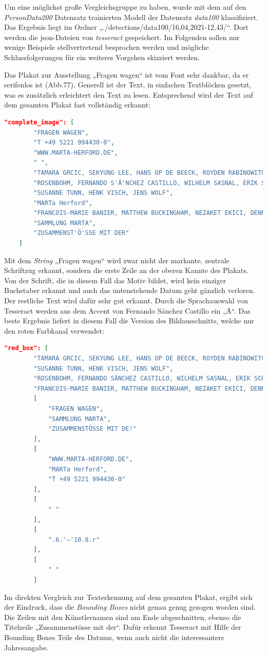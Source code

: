 \documentclass[a4paper,12pt,ngerman]{article}
\begin{document}
Um eine möglichst große Vergleichsgruppe zu haben, wurde mit dem auf den \textit{PersonData200} Datensatz trainierten Modell der Datensatz \textit{data100} klassifiziert. Das Ergebnis liegt im Ordner „./detections/data100/16,04,2021-12,43/“. Dort werden die json-Dateien von \textit{tesseract} gespeichert. Im Folgenden sollen nur wenige Beispiele stellvertretend besprochen werden und mögliche Schlussfolgerungen für ein weiteres Vorgehen skizziert werden.

Das Plakat zur Ausstellung „Fragen wagen“ ist vom Font sehr dankbar, da er serifenlos ist (Abb.77). Generell ist der Text, in einfachen Textblöcken gesetzt, was es zusätzlich erleichtert den Text zu lesen. Entsprechend wird der Text auf dem gesamten Plakat fast vollständig erkannt:

\begin{lstlisting}[language=json,escapeinside='']
	"complete_image": [
        "FRAGEN WAGEN",
        "T +49 5221 994430-0",
        "WWW.MARTA-HERFORD.DE",
        " ",
        "TAMARA GRCIC, SEKYUNG LEE, HANS OP DE BEECK, ROYDEN RABINOWITCH, LARS",
		"ROSENBOHM, FERNANDO S'Ä'NCHEZ CASTILLO, WILHELM SASNAL, ERIK SCHMIDT,",
        "SUSANNE TUNN, HENK VISCH, JENS WOLF",
        "MARTa Herford",
        "FRANCOIS-MARIE BANIER, MATTHEW BUCKINGHAM, NEZAKET EKICI, DENNIS FESER,",
        "SAMMLUNG MARTA",
        "ZUSAMMENST'Ö'SSE MIT DER"
    ]
\end{lstlisting}

Mit dem \textit{String} „Fragen wagen“ wird zwar nicht der markante, zentrale Schriftzug erkannt, sondern die erste Zeile an der oberen Kannte des Plakats. Von der Schrift, die in diesem Fall das Motiv bildet, wird kein einziger Buchstaber erkannt und auch das untenstehende Datum geht gänzlich verloren. Der restliche Text wird dafür sehr gut erkannt. Durch die Sprachauswahl von Tesseract werden aus dem Accent von Fernando Sánchez Castillo ein „Ä“. Das beste Ergebnis liefert in diesem Fall die Version des Bildausschnitts, welche nur den roten Farbkanal verwendet:

\begin{lstlisting}[language=json,escapeinside='']
	"red_box": [
        "TAMARA GRCIC, SEKYUNG LEE, HANS OP DE BEECK, ROYDEN RABINOWITCH, LAR",
        "SUSANNE TUNN, HENK VISCH, JENS WOLF",
        "ROSENBOHM, FERNANDO SÄNCHEZ CASTILLO, WILHELM SASNAL, ERIK SCHMIDI",
        "FRANCOIS-MARIE BANIER, MATTHEW BUCKINGHAM, NEZAKET EKICI, DENNIS FES|",
        [
            "FRAGEN WAGEN",
            "SAMMLUNG MARTA",
            "ZUSAMMENSTÖSSE MIT DE!"
        ],
        [
            "WWW.MARTA-HERFORD.DE",
            "MARTa Herford",
            "T +49 5221 994430-0"
        ],
        [
            " "
        ],
        [
            ".6.'—'10.8.r"
        ],
        [
            " "
        ]
\end{lstlisting}
Im direkten Vergleich zur Texterkennung auf dem gesamten Plakat, ergibt sich der Eindruck, dass die \textit{Bounding Boxes} nicht genau genug gezogen worden sind. Die Zeilen mit den Künstlernamen sind am Ende abgeschnitten, ebenso die Titelzeile „Zusammenstösse mit der“. Dafür erkennt Tesseract mit Hilfe der Bounding Boxes Teile des Datums, wenn auch nicht die interessantere Jahresangabe. \\
\end{document}
